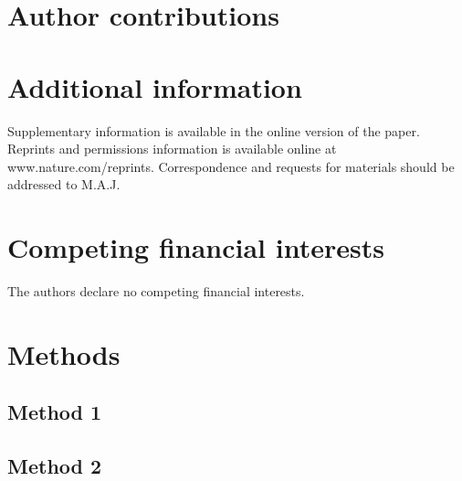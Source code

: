 \documentclass[twocolumn, linenumbers, superscriptaddress]{revtex4-1}
\begin{document}
	\begin{acknowledgements}

	\end{acknowledgements}

	\section*{Author contributions}
	
	\section*{Additional information}
		Supplementary information is available in the online version of the paper.
		Reprints and permissions information is available online at www.nature.com/reprints.
		Correspondence and requests for materials should be addressed to M.A.J.
	
	\section*{Competing financial interests}
		The authors declare no competing financial interests.
	
	\newpage

	\section*{Methods}
		\subsection*{Method 1}
			
		\subsection*{Method 2}
\end{document}
